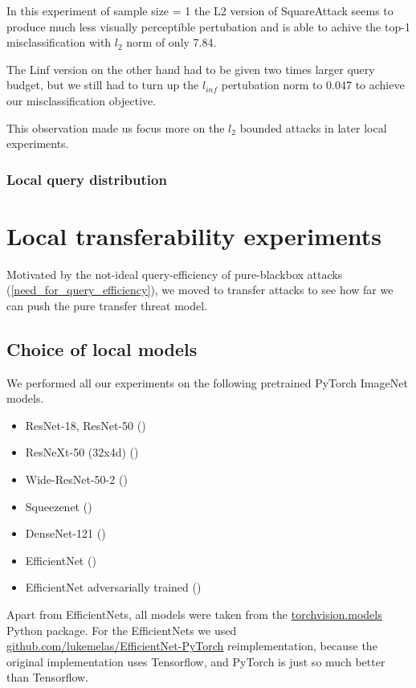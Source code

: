 In this experiment of sample size = 1 the L2 version of SquareAttack seems to produce much less visually perceptible pertubation and is able to achive the top-1 misclassification with $l_2$ norm of only 7.84.

The Linf version on the other hand had to be given two times larger query budget, but we still had to turn up the $l_{inf}$ pertubation norm to 0.047 to achieve our misclassification objective.


This observation made us focus more on the $l_2$ bounded attacks in later local experiments.

\subsubsection{Local query distribution}





\section{Local transferability experiments}
Motivated by the not-ideal query-efficiency of pure-blackbox attacks (\ref{need_for_query_efficiency}), we moved to transfer attacks to see how far we can push the pure transfer threat model.


\subsection{Choice of local models}
We performed all our experiments on the following pretrained PyTorch ImageNet models.

\begin{itemize}
    \item ResNet-18, ResNet-50 (\cite{he2015deep})
    \item ResNeXt-50 (32x4d) (\cite{xie2017aggregated})
    \item Wide-ResNet-50-2 (\cite{zagoruyko2017wide})
    \item Squeezenet (\cite{iandola2016squeezenet})
    \item DenseNet-121 (\cite{huang2018densely})
    \item EfficientNet (\cite{tan2020efficientnet})
    \item EfficientNet adversarially trained (\cite{tramer2020ensemble})
\end{itemize}

Apart from EfficientNets, all models were taken from the \href{https://pytorch.org/vision/stable/models.html}{torchvision.models} Python package. For the EfficientNets we used \href{https://github.com/lukemelas/EfficientNet-PyTorch}{github.com/lukemelas/EfficientNet-PyTorch} reimplementation, because the original implementation uses Tensorflow, and PyTorch is just so much better than Tensorflow.

